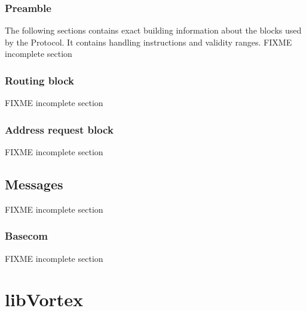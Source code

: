 \subsubsection{Preamble}
The following sections contains exact building information about the blocks used by the Protocol. It contains handling instructions and validity ranges.
FIXME incomplete section

\subsubsection{Routing block}
FIXME incomplete section

\subsubsection{Address request block}
FIXME incomplete section

\subsection{Messages}
FIXME incomplete section

\subsubsection{Basecom}
FIXME incomplete section

\section{libVortex}